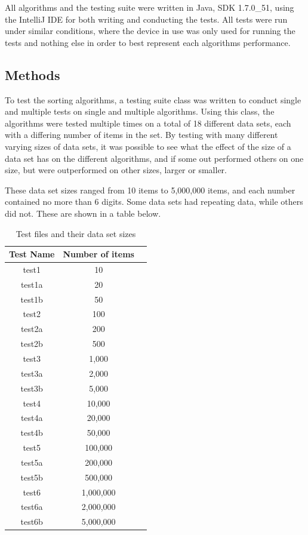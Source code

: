 \documentclass{acm_proc_article-sp}
\begin{document}
All algorithms and the 
testing suite were written in Java, SDK 1.7.0\_51, using 
the IntelliJ IDE for both writing and conducting the tests. All tests were
run under similar conditions, where the device in use was only used for
running the tests and nothing else in order to best
represent each algorithms performance.


\subsection{Methods}
To test the sorting algorithms, a testing suite class was written to conduct
single and multiple tests on single and multiple algorithms. Using this class, 
the algorithms were tested multiple times on a total of 18 different data sets,
each with a differing number of items in the set. By testing with many different
varying sizes of data sets, it was possible to see what the effect of the size
of a data set has on the different algorithms, and if some out performed
others on one size, but were outperformed on other sizes, larger or smaller.

These data set sizes ranged from 10 items to 5,000,000 items, and each number contained no more than 6 digits. Some data sets had repeating data, while others did not. These are shown in a table below.

\begin{table}[h]
\centering
\caption{Test files and their data set sizes}
\begin{tabular}{|c|c|l|} \hline
Test Name&Number of items\\ \hline
test1 & 10\\ \hline
test1a & 20\\ \hline
test1b & 50\\ \hline
test2 & 100\\ \hline
test2a & 200\\ \hline
test2b & 500\\ \hline
test3 & 1,000\\ \hline
test3a & 2,000\\ \hline
test3b & 5,000\\ \hline
test4 & 10,000\\ \hline
test4a & 20,000\\ \hline
test4b & 50,000\\ \hline
test5 & 100,000\\ \hline
test5a & 200,000\\ \hline
test5b & 500,000\\ \hline
test6 & 1,000,000\\ \hline
test6a & 2,000,000\\ \hline
test6b & 5,000,000\\ 
\hline\end{tabular}
\end{table}
\end{document}
